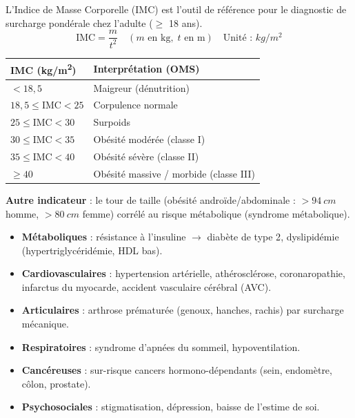 \documentclass[11pt]{article}
\newcommand{\cle}[1]{{\popxbold\color{popdark}#1}}
\begin{document}
\begin{propriete}
L'\cle{Indice de Masse Corporelle (IMC)} est l'outil de référence pour le diagnostic de surcharge pondérale chez l'adulte ($\ge$ 18 ans).
\[ \text{IMC} = \frac{m}{t^2} \quad (m \text{ en kg}, \; t \text{ en m}) \quad \text{Unité : } \si{kg/m^2} \]
\begin{center}
\begin{tabularx}{\linewidth}{|l|X|}
\hline
\rowcolor{popblueL} \textbf{IMC (\si{kg/m^2})} & \textbf{Interprétation (OMS)} \\
\hline
$< 18,5$ & Maigreur (dénutrition) \\
\hline
$18,5 \le \text{IMC} < 25$ & Corpulence normale \\
\hline
$25 \le \text{IMC} < 30$ & Surpoids \\
\hline
$30 \le \text{IMC} < 35$ & Obésité modérée (classe I) \\
\hline
$35 \le \text{IMC} < 40$ & Obésité sévère (classe II) \\
\hline
$\ge 40$ & Obésité massive / morbide (classe III) \\
\hline
\end{tabularx}
\end{center}
\textbf{Autre indicateur} : le \cle{tour de taille} (obésité androïde/abdominale : $> \SI{94}{cm}$ homme, $> \SI{80}{cm}$ femme) corrélé au risque métabolique (syndrome métabolique).
\end{propriete}

\begin{propriete}
\begin{itemize}
\item \textbf{Métaboliques} : résistance à l'insuline $\rightarrow$ \cle{diabète de type 2}, dyslipidémie (hypertriglycéridémie, HDL bas).
\item \textbf{Cardiovasculaires} : \cle{hypertension artérielle}, athérosclérose, coronaropathie, infarctus du myocarde, accident vasculaire cérébral (AVC).
\item \textbf{Articulaires} : arthrose prématurée (genoux, hanches, rachis) par surcharge mécanique.
\item \textbf{Respiratoires} : syndrome d'apnées du sommeil, hypoventilation.
\item \textbf{Cancéreuses} : sur-risque cancers hormono-dépendants (sein, endomètre, côlon, prostate).
\item \textbf{Psychosociales} : stigmatisation, dépression, baisse de l'estime de soi.
\end{itemize}
\end{propriete}
\end{document}
